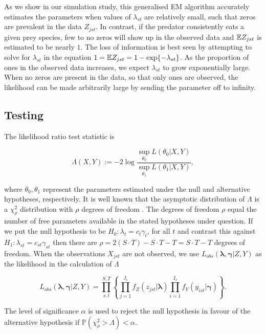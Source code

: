 \documentclass[12pt]{article}
\begin{document}
As we show in our simulation study, this generalised EM algorithm accurately estimates the parameters when values of $\lambda_{st}$ are relatively small, such that zeros are prevalent in the data $Z_{jst}$.  In contrast, if the predator consistently eats a given prey species, few to no zeros will show up in the observed data and $\mathbb{E} Z_{jst}$ is estimated to be nearly $1$.  The loss of information is best seen by attempting to solve for $\lambda_{st}$ in the equation $1 = \mathbb{E} Z_{jst} = 1 - \exp\{-\lambda_{st}\}$.  As the proportion of ones in the observed data increases, we expect $\lambda_{st}$ to grow exponentially large.  When no zeros are present in the data, so that only ones are observed, the likelihood can be made arbitrarily large by sending the parameter off to infinity.  

\subsection{Testing}
\label{sec:test}
The likelihood ratio test statistic is

\begin{equation*}
  \label{eq:LRT}
    \Lambda(X,Y) := -2 \log{ \frac{ \sup_{\theta_0} L(\theta_0|X,Y)}{ \sup_{\theta_1} L(\theta_1|X,Y)} },
\end{equation*}

\noindent where $\theta_0, \theta_1$ represent the parameters estimated under the null and alternative hypotheses, respectively.  It is well known that the asymptotic distribution of $\Lambda$ is a $\chi_{\rho}^2$ distribution with $\rho$ degrees of freedom \citep{Wilks:1938}.  The degrees of freedom $\rho$ equal the number of free parameters available in the stated hypotheses under question.  If we put the null hypothesis to be $H_0: \lambda_t = c_t \gamma_t$, for all $t$ and contrast this against $H_1: \lambda_{st} = c_{st}\gamma_{st}$ then there are $\rho = 2(S \cdot T) - S \cdot T - T = S \cdot T - T$ degrees of freedom.  When the observations $X_{jst}$ are not observed, we use $L_{obs}(\boldsymbol{\lambda}, \boldsymbol{\gamma}|Z,Y)$ as the likelihood in the calculation of $\Lambda$

\[ L_{obs}(\boldsymbol{\lambda}, \boldsymbol{\gamma}|Z,Y) = \prod_{s,t}^{S,T} \left\{ \prod_{j=1}^{J_t}f_Z(z_{jst}|\boldsymbol{\lambda}) \prod_{i=1}^{I_t}f_Y(y_{ist}|\boldsymbol{\gamma}) \right\}. \]

\noindent The level of significance $\alpha$ is used to reject the null hypothesis in favour of the alternative hypothesis if $\mathbb{P}(\chi^2_{\rho} > \Lambda) < \alpha$.  
\end{document}
